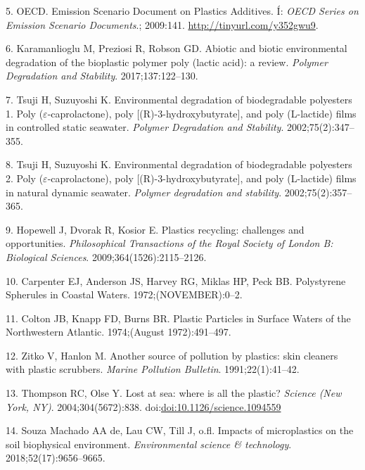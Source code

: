 \documentclass[icelandic,]{book}
\begin{document}
\leavevmode\hypertarget{ref-OECD2009}{}%
5. OECD. Emission Scenario Document on Plastics Additives. Í: \emph{OECD Series on Emission Scenario Documents}.; 2009:141. \url{http://tinyurl.com/y352gwu9}.

\leavevmode\hypertarget{ref-karamanlioglu2017abiotic}{}%
6. Karamanlioglu M, Preziosi R, Robson GD. Abiotic and biotic environmental degradation of the bioplastic polymer poly (lactic acid): a review. \emph{Polymer Degradation and Stability}. 2017;137:122--130.

\leavevmode\hypertarget{ref-tsuji2002environmental-1}{}%
7. Tsuji H, Suzuyoshi K. Environmental degradation of biodegradable polyesters 1. Poly (\(\varepsilon\)-caprolactone), poly {[}(R)-3-hydroxybutyrate{]}, and poly (L-lactide) films in controlled static seawater. \emph{Polymer Degradation and Stability}. 2002;75(2):347--355.

\leavevmode\hypertarget{ref-tsuji2002environmental-2}{}%
8. Tsuji H, Suzuyoshi K. Environmental degradation of biodegradable polyesters 2. Poly (\(\varepsilon\)-caprolactone), poly {[}(R)-3-hydroxybutyrate{]}, and poly (L-lactide) films in natural dynamic seawater. \emph{Polymer degradation and stability}. 2002;75(2):357--365.

\leavevmode\hypertarget{ref-hopewell2009plastics}{}%
9. Hopewell J, Dvorak R, Kosior E. Plastics recycling: challenges and opportunities. \emph{Philosophical Transactions of the Royal Society of London B: Biological Sciences}. 2009;364(1526):2115--2126.

\leavevmode\hypertarget{ref-Waters1972}{}%
10. Carpenter EJ, Anderson JS, Harvey RG, Miklas HP, Peck BB. Polystyrene Spherules in Coastal Waters. 1972;(NOVEMBER):0--2.

\leavevmode\hypertarget{ref-Colton1974}{}%
11. Colton JB, Knapp FD, Burns BR. Plastic Particles in Surface Waters of the Northwestern Atlantic. 1974;(August 1972):491--497.

\leavevmode\hypertarget{ref-zitko1991another}{}%
12. Zitko V, Hanlon M. Another source of pollution by plastics: skin cleaners with plastic scrubbers. \emph{Marine Pollution Bulletin}. 1991;22(1):41--42.

\leavevmode\hypertarget{ref-Thompson2004lost}{}%
13. Thompson RC, Olse Y. Lost at sea: where is all the plastic? \emph{Science (New York, NY)}. 2004;304(5672):838. doi:\href{https://doi.org/doi:10.1126/science.1094559}{doi:10.1126/science.1094559}

\leavevmode\hypertarget{ref-de2018impacts}{}%
14. Souza Machado AA de, Lau CW, Till J, o.fl. Impacts of microplastics on the soil biophysical environment. \emph{Environmental science \& technology}. 2018;52(17):9656--9665.
\end{document}
